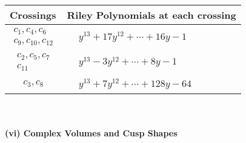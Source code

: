\documentclass[1p]{elsarticle_modified}
\theoremstyle{definition}
\begin{document}
\begin{tabular}{m{50pt}|m{274pt}}
Crossings & \hspace{64pt}Riley Polynomials at each crossing \\
\hline $$\begin{aligned}c_{1},c_{4},c_{6}\\c_{9},c_{10},c_{12}\end{aligned}$$&$\begin{aligned}
&y^{13}+17 y^{12}+\cdots+16 y-1
\end{aligned}$\\
\hline $$\begin{aligned}c_{2},c_{5},c_{7}\\c_{11}\end{aligned}$$&$\begin{aligned}
&y^{13}-3 y^{12}+\cdots+8 y-1
\end{aligned}$\\
\hline $$\begin{aligned}c_{3},c_{8}\end{aligned}$$&$\begin{aligned}
&y^{13}+7 y^{12}+\cdots+128 y-64
\end{aligned}$\\
\hline
\end{tabular}\\~\\
\newpage\flushleft \textbf{(vi) Complex Volumes and Cusp Shapes}
\end{document}

